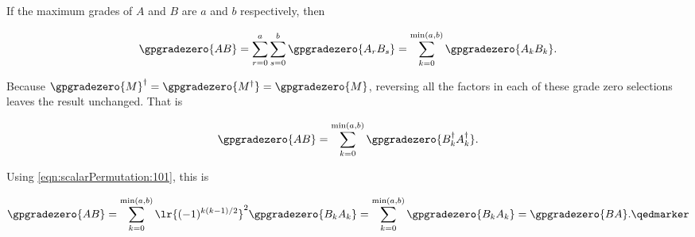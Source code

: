 
If the maximum grades of \( A \) and \( B \) are \( a \) and \( b \) respectively, then

\begin{equation}\label{eqn:scalarPermutation:41}
\gpgradezero{A B}
=
\sum_{r = 0}^a \sum_{s = 0}^b \gpgradezero{A_r B_s}
=
\sum_{k = 0}^{\min(a,b)} \gpgradezero{A_k B_k}.
\end{equation}

%
Because \( \gpgradezero{M}^\dagger = \gpgradezero{M^\dagger} = \gpgradezero{M} \), reversing all the factors in each of these grade zero selections leaves the result unchanged.  That is

\begin{equation}\label{eqn:scalarPermutation:61}
\gpgradezero{A B}
=
\sum_{k = 0}^{\min(a,b)} \gpgradezero{B_k^\dagger A_k^\dagger}.
\end{equation}

Using \cref{eqn:scalarPermutation:101}, this is

\begin{dmath}\label{eqn:scalarPermutation:121}
\gpgradezero{A B}
=
\sum_{k = 0}^{\min(a,b)} \lr{(-1)^{k(k-1)/2} }^2 \gpgradezero{B_k A_k}
=
\sum_{k = 0}^{\min(a,b)} \gpgradezero{B_k A_k}
=
\gpgradezero{ B A }. \qedmarker
\end{dmath}
